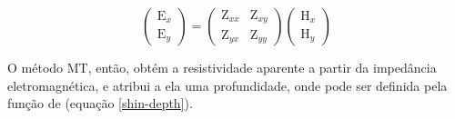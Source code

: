         \begin{equation}
            \label{tensor-impe}
            \left (\begin{array}{c}
                \textrm{E}_x\\
                \textrm{E}_y
                    \end{array}\right)
                =
            \left (\begin{array}{cc}
                \textrm{Z}_{xx} & \textrm{Z}_{xy}\\
                \textrm{Z}_{yx} & \textrm{Z}_{yy}
                    \end{array}\right)
            \left (\begin{array}{c}
                \textrm{H}_x\\
                \textrm{H}_y
                    \end{array}\right)
	    \end{equation}
	    
	    O método MT, então, obtém a resistividade aparente a partir da impedância eletromagnética, e atribui a ela uma profundidade, onde pode ser definida pela função de  (equação \ref{shin-depth}).          
